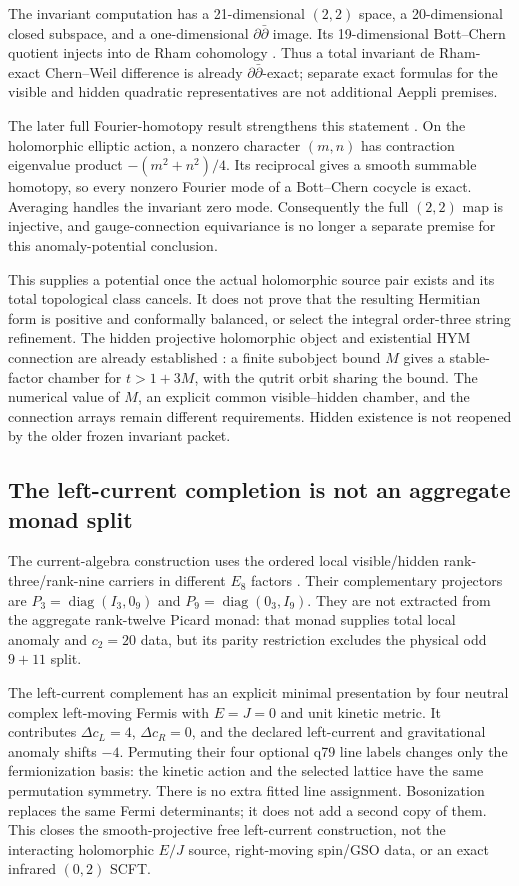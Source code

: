 \documentclass[11pt]{article}
\begin{document}
The invariant computation has a 21-dimensional $(2,2)$ space, a
20-dimensional closed subspace, and a one-dimensional
$\partial\bar\partial$ image. Its 19-dimensional Bott--Chern quotient
injects into de Rham cohomology \cite{FrozenBC}. Thus a total invariant
de Rham-exact Chern--Weil difference is already
$\partial\bar\partial$-exact; separate exact formulas for the visible
and hidden quadratic representatives are not additional Aeppli premises.

The later full Fourier-homotopy result strengthens this statement
\cite{FrozenFullBC}. On the holomorphic elliptic action, a nonzero
character $(m,n)$ has contraction eigenvalue product
$-(m^2+n^2)/4$. Its reciprocal gives a smooth summable homotopy, so
every nonzero Fourier mode of a Bott--Chern cocycle is exact. Averaging
handles the invariant zero mode. Consequently the full $(2,2)$ map is
injective, and gauge-connection equivariance is no longer a separate
premise for this anomaly-potential conclusion.

This supplies a potential once the actual holomorphic source pair exists
and its total topological class cancels. It does not prove that the
resulting Hermitian form is positive and conformally balanced, or select
the integral order-three string refinement. The hidden projective
holomorphic object and existential HYM connection are already established
\cite{FrozenHiddenHYM}: a finite subobject bound $M$ gives a stable-factor
chamber for $t>1+3M$, with the qutrit orbit sharing the bound. The numerical
value of $M$, an explicit common visible--hidden chamber, and the
connection arrays remain different requirements. Hidden existence is not
reopened by the older frozen invariant packet.

\subsection{The left-current completion is not an aggregate monad split}
\label{sec:fermi-completion}

The current-algebra construction uses the ordered local visible/hidden
rank-three/rank-nine carriers in different $E_8$ factors
\cite{FrozenFermi}. Their complementary projectors are
$P_3=\operatorname{diag}(I_3,0_9)$ and
$P_9=\operatorname{diag}(0_3,I_9)$. They are not extracted from the
aggregate rank-twelve Picard monad: that monad supplies total local
anomaly and $c_2=20$ data, but its parity restriction excludes the
physical odd $9+11$ split.

The left-current complement has an explicit minimal presentation by four
neutral complex left-moving Fermis with $E=J=0$ and unit kinetic metric.
It contributes $\Delta c_L=4$, $\Delta c_R=0$, and the declared
left-current and gravitational anomaly shifts $-4$. Permuting their
four optional q79 line labels changes only the fermionization basis:
the kinetic action and the selected lattice have the same permutation
symmetry. There is no extra fitted line assignment. Bosonization replaces
the same Fermi determinants; it does not add a second copy of them.
This closes the smooth-projective free left-current construction, not
the interacting holomorphic $E/J$ source, right-moving spin/GSO data,
or an exact infrared $(0,2)$ SCFT.
\end{document}
